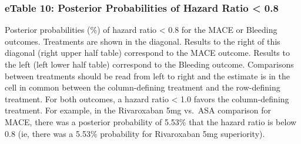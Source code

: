 \documentclass[
  12pt,
]{article}
\begin{document}
\begin{landscape}
\hypertarget{etable-10-posterior-probabilities-of-hazard-ratio-0.8}{%
\subsubsection{eTable 10: Posterior Probabilities of Hazard Ratio
\textless{}
0.8}\label{etable-10-posterior-probabilities-of-hazard-ratio-0.8}}

\begin{table}[!h]
\centering
{}
\end{table}

Posterior probabilities (\%) of hazard ratio \textless{} 0.8 for the
MACE or Bleeding outcomes. Treatments are shown in the diagonal. Results
to the right of this diagonal (right upper half table) correspond to the
MACE outcome. Results to the left (left lower half table) correspond to
the Bleeding outcome. Comparisons between treatments should be read from
left to right and the estimate is in the cell in common between the
column-defining treatment and the row-defining treatment. For both
outcomes, a hazard ratio \textless{} 1.0 favors the column-defining
treatment. For example, in the Rivaroxaban 5mg vs.~ASA comparison for
MACE, there was a posterior probability of 5.53\% that the hazard ratio
is below 0.8 (ie, there was a 5.53\% probability for Rivaroxaban 5mg
superiority).

\newpage


\end{landscape}
\end{document}
